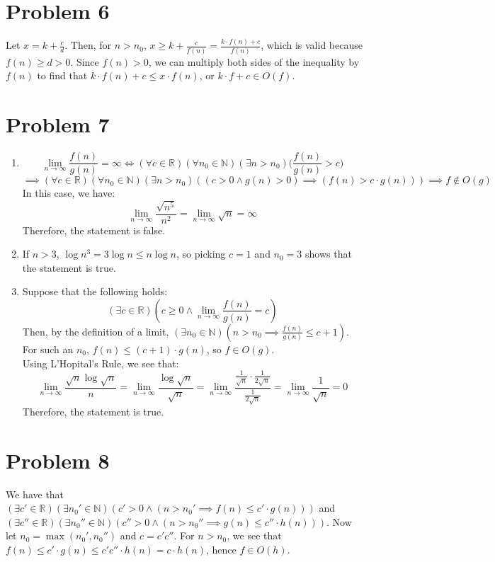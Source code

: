 \documentclass[12pt]{article}
\begin{document}
	\section{Problem 6}
		Let $x = k + \frac{c}{d}$. Then, for $n > n_0$, $x \ge k + \frac{c}{f(n)} = \frac{k \cdot f(n) + c}{f(n)}$, which is valid because $f(n) \ge d > 0$. Since $f(n) > 0$, we can multiply both sides of the inequality by $f(n)$ to find that $k \cdot f(n) + c \le x \cdot f(n)$, or $k \cdot f + c \in O(f)$.
	\section{Problem 7}
		\begin{enumerate}
			\item
				$$\lim_{n \to \infty} \frac{f(n)}{g(n)} = \infty \iff (\forall c \in \mathbb{R})(\forall n_0 \in \mathbb{N})(\exists n > n_0)\Bigg(\frac{f(n)}{g(n)} > c\Bigg)$$
				$$\implies (\forall c \in \mathbb{R})(\forall n_0 \in \mathbb{N})(\exists n > n_0)((c > 0 \wedge g(n) > 0) \implies (f(n) > c \cdot g(n))) \implies f \notin O(g)$$
				In this case, we have:
				$$\lim_{n \to \infty} \frac{\sqrt{n^5}}{n^2} = \lim_{n \to \infty} \sqrt{n} = \infty$$
				Therefore, the statement is false.
			\item
				If $n > 3$, $\log n^3 = 3 \log n \le n \log n$, so picking $c = 1$ and $n_0 = 3$ shows that the statement is true.
			\item
				Suppose that the following holds:
				$$(\exists c \in \mathbb{R})(c \ge 0 \wedge \lim_{n \to \infty} \frac{f(n)}{g(n)} = c)$$
				Then, by the definition of a limit, $(\exists n_0 \in \mathbb{N})(n > n_0 \implies \frac{f(n)}{g(n)} \le c + 1)$. For such an $n_0$, $f(n) \le (c + 1) \cdot g(n)$, so $f \in O(g)$.\\
				Using L'Hopital's Rule, we see that:
				$$\lim_{n \to \infty} \frac{\sqrt{n} \log \sqrt{n}}{n} = \lim_{n \to \infty} \frac{\log \sqrt{n}}{\sqrt{n}} = \lim_{n \to \infty} \frac{\frac{1}{\sqrt{n}} \cdot \frac{1}{2 \sqrt{n}}}{\frac{1}{2 \sqrt{n}}} = \lim_{n \to \infty} \frac{1}{\sqrt{n}} = 0$$
				Therefore, the statement is true.
		\end{enumerate}
	\section{Problem 8}
		We have that $(\exists c' \in \mathbb{R})(\exists n_0' \in \mathbb{N})(c' > 0 \wedge (n > n_0' \implies f(n) \le c' \cdot g(n)))$ and $(\exists c'' \in \mathbb{R})(\exists n_0'' \in \mathbb{N})(c'' > 0 \wedge (n > n_0'' \implies g(n) \le c'' \cdot h(n)))$. Now let $n_0 = \max(n_0', n_0'')$ and $c = c'c''$. For $n > n_0$, we see that $f(n) \le c' \cdot g(n) \le c'c'' \cdot h(n) = c \cdot h(n)$, hence $f \in O(h)$.
\end{document}

